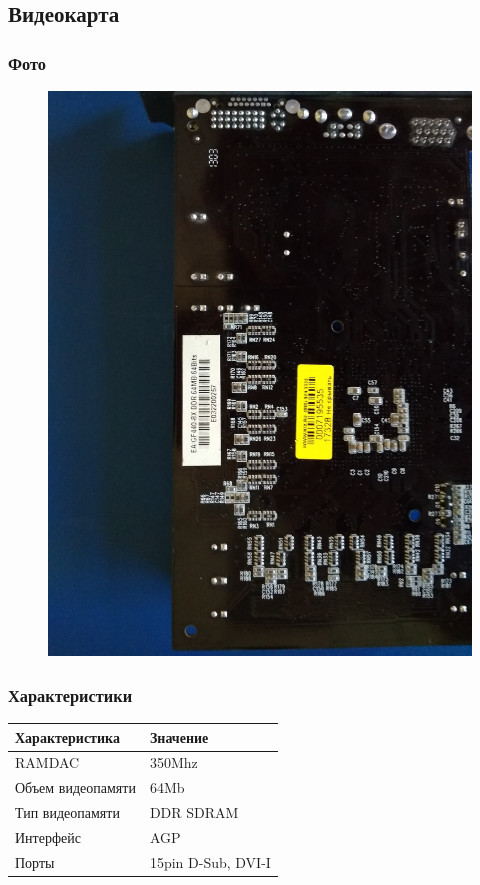 \documentclass[a4paper]{article}
\begin{document}
\subsection{Видеокарта}
\subsubsection{Фото}
\begin{figure}[H]
\centering
\includegraphics[scale=0.1]{gpu.jpg} 
\end{figure}
\subsubsection{Характеристики}
\begin{table}[H]
    \centering
    \begin{tabular}{|l|l|}
    \hline
    Характеристика & Значение \\
    \hline
    RAMDAC & 350Mhz \\
    Объем видеопамяти & 64Mb \\
    Тип видеопамяти & DDR SDRAM \\
    Интерфейс & AGP \\
    Порты & 15pin D-Sub, DVI-I \\
    \hline
\end{tabular}
\end{table}
\end{document}
